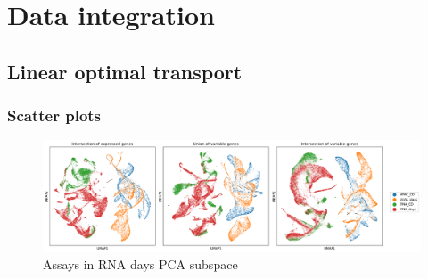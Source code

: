 \documentclass[a4paper]{article}
\begin{document}
\FloatBarrier
\section{Data integration}

\subsection{Linear optimal transport}

\subsubsection{Scatter plots}
\begin{figure}[!htb]
  \centering
  \includegraphics[width=\textwidth]{../figures/hematopoiesis/assays_RNA_days_subspace.png}
  \caption{Assays in RNA days PCA subspace}
\end{figure}
\end{document}
